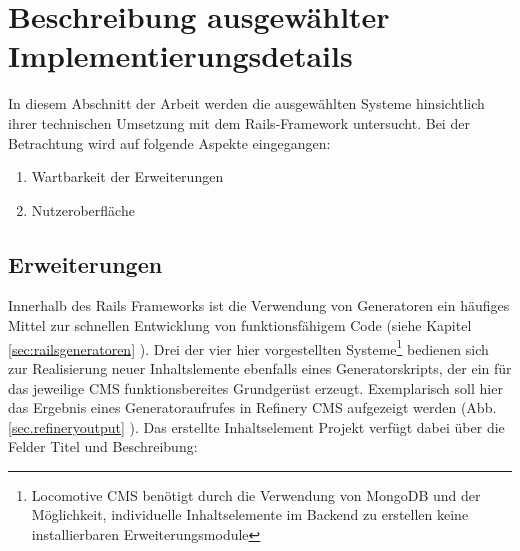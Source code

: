 \chapter{Beschreibung ausgewählter Implementierungsdetails}
\label{chap:probleme}
In diesem Abschnitt der Arbeit werden die ausgewählten Systeme hinsichtlich ihrer technischen Umsetzung mit dem Rails-Framework untersucht. Bei der Betrachtung wird auf folgende Aspekte eingegangen:

\begin{enumerate}
\item Wartbarkeit der Erweiterungen
\item Nutzeroberfläche
\end{enumerate}


\section{Erweiterungen}
\label{dryverstoss}
Innerhalb des Rails Frameworks ist die Verwendung von Generatoren ein häufiges Mittel zur schnellen Entwicklung von funktionsfähigem Code (siehe Kapitel \ref{sec:railsgeneratoren} ). Drei der vier hier vorgestellten Systeme\footnote{Locomotive CMS benötigt durch die Verwendung von MongoDB und der Möglichkeit, individuelle Inhaltselemente im Backend zu erstellen keine installierbaren Erweiterungsmodule} bedienen sich zur Realisierung neuer Inhaltslemente ebenfalls eines Generatorskripts, der ein für das jeweilige CMS funktionsbereites Grundgerüst erzeugt. Exemplarisch soll hier das Ergebnis eines Generatoraufrufes in Refinery CMS aufgezeigt werden (Abb. \ref{sec.refineryoutput} ). Das erstellte Inhaltselement Projekt verfügt dabei über die Felder Titel und Beschreibung:


%

